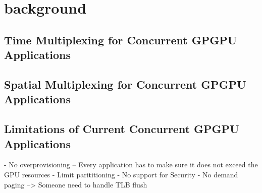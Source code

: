 \section{background}

\subsection{Time Multiplexing for Concurrent GPGPU Applications}



\subsection{Spatial Multiplexing for Concurrent GPGPU Applications}



\subsection{Limitations of Current Concurrent GPGPU Applications}


- No overprovisioning
-- Every application has to make sure it does not exceed the GPU resources
- Limit parititioning
- No support for Security
- No demand paging --> Someone need to handle TLB flush

